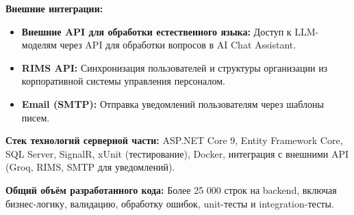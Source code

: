 \textbf{Внешние интеграции:}
\begin{itemize}
	\item \textbf{Внешние API для обработки естественного языка:} Доступ к LLM-моделям через API для обработки вопросов в AI Chat Assistant.
	\item \textbf{RIMS API:} Синхронизация пользователей и структуры организации из корпоративной системы управления персоналом.
	\item \textbf{Email (SMTP):} Отправка уведомлений пользователям через шаблоны писем.
\end{itemize}

\textbf{Стек технологий серверной части:} ASP.NET Core 9, Entity Framework Core, SQL Server, SignalR, xUnit (тестирование), Docker, интеграция с внешними API (Groq, RIMS, SMTP для уведомлений).

\textbf{Общий объём разработанного кода:} Более 25 000 строк на backend, включая бизнес-логику, валидацию, обработку ошибок, unit-тесты и integration-тесты.
